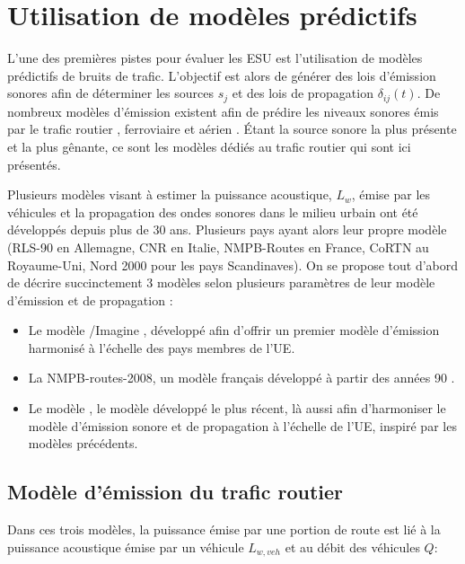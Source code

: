 \section{Utilisation de modèles prédictifs}

L'une des premières pistes pour évaluer les ESU est l'utilisation de modèles prédictifs de bruits de trafic. L'objectif est alors de générer des lois d'émission sonores afin de déterminer les sources $s_j$ et des lois de propagation $\delta_{ij}(t)$. De nombreux modèles d'émission existent afin de prédire les niveaux sonores émis par le trafic routier \cite{quartieri2009review}, ferroviaire \cite{van2000railway} et aérien \cite{zaporozhets1998aircraft}. Étant la source sonore la plus présente et la plus gênante, ce sont les modèles dédiés au trafic routier qui sont ici présentés.

Plusieurs modèles visant à estimer la puissance acoustique, $L_w$, émise par les véhicules et la propagation des ondes sonores dans le milieu urbain ont été développés depuis plus de 30 ans. Plusieurs pays ayant alors leur propre modèle (RLS-90 en Allemagne, CNR en Italie, NMPB-Routes en France, CoRTN au Royaume-Uni, Nord 2000 pour les pays Scandinaves). On se propose tout d'abord de décrire succinctement 3 modèles selon plusieurs paramètres de leur modèle d'émission et de propagation :

\begin{itemize}
\item Le modèle /Imagine \cite{jonasson2004source}, développé afin d'offrir un premier modèle d'émission harmonisé à l'échelle des pays membres de l'UE.
\item La NMPB-routes-2008, un modèle français développé à partir des années 90 \cite{setra_prevision_2009-1, setra_prevision_2009-2}.
\item Le modèle   \cite{CNOSSOS}, le modèle développé le plus récent, là aussi afin d'harmoniser le modèle d'émission sonore et de propagation à l'échelle de l'UE, inspiré par les modèles précédents.
\end{itemize}

\subsection{Modèle d'émission du trafic routier}\label{part:modele_emission}

Dans ces trois modèles, la puissance émise par une portion de route est lié à la puissance acoustique émise par un véhicule $L_{w,veh}$ et au débit des véhicules $Q$:

